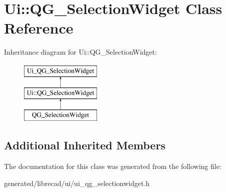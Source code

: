 \hypertarget{classUi_1_1QG__SelectionWidget}{\section{Ui\-:\-:Q\-G\-\_\-\-Selection\-Widget Class Reference}
\label{classUi_1_1QG__SelectionWidget}
}
Inheritance diagram for Ui\-:\-:Q\-G\-\_\-\-Selection\-Widget\-:\begin{figure}[H]
\begin{center}
\leavevmode
\includegraphics[height=3.000000cm]{classUi_1_1QG__SelectionWidget}
\end{center}
\end{figure}
\subsection*{Additional Inherited Members}


The documentation for this class was generated from the following file\-:\begin{DoxyCompactItemize}
\item 
generated/librecad/ui/ui\-\_\-qg\-\_\-selectionwidget.\-h\end{DoxyCompactItemize}

